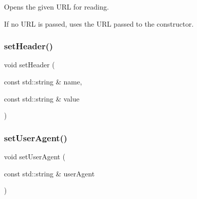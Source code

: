 Opens the given U\+RL for reading. 

If no U\+RL is passed, uses the U\+RL passed to the constructor. \mbox{\label{classiurlstream_af7065da3945b84ffb547b8bad9ddf8dc}} 
\subsubsection{\texorpdfstring{set\+Header()}{setHeader()}}
{\footnotesize\ttfamily void set\+Header (\begin{DoxyParamCaption}\item[{const std\+::string \&}]{name,  }\item[{const std\+::string \&}]{value }\end{DoxyParamCaption})}

\mbox{\label{classiurlstream_a766286050e9b8fe08919f8353ecb4031}} 
\subsubsection{\texorpdfstring{set\+User\+Agent()}{setUserAgent()}}
{\footnotesize\ttfamily void set\+User\+Agent (\begin{DoxyParamCaption}\item[{const std\+::string \&}]{user\+Agent }\end{DoxyParamCaption})}

